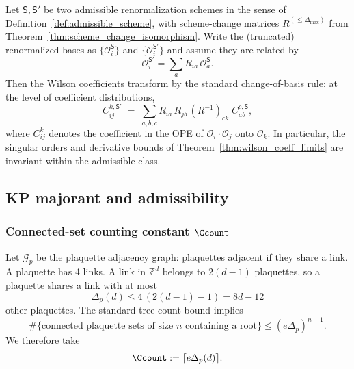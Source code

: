 \begin{corollary}\label{cor:wilson_scheme_covariance}
Let $\mathsf S,\mathsf S'$ be two admissible renormalization schemes in the sense of Definition~\ref{def:admissible_scheme},
with scheme-change matrices $R^{(\le\Delta_{\max})}$ from Theorem~\ref{thm:scheme_change_isomorphism}.
Write the (truncated) renormalized bases as $\{\mathcal O_i^{\mathsf S}\}$ and $\{\mathcal O_i^{\mathsf S'}\}$ and assume they are related by
\[
\mathcal O_i^{\mathsf S'}=\sum_{a} R_{ia}\,\mathcal O_a^{\mathsf S}.
\]
Then the Wilson coefficients transform by the standard change-of-basis rule: at the level of coefficient distributions,
\begin{equation}\label{eq:wilson_covariance_rule}
C^{k,\mathsf S'}_{ij}\;=\;\sum_{a,b,c} R_{ia}\,R_{jb}\,(R^{-1})_{ck}\; C^{c,\mathsf S}_{ab},
\end{equation}
where $C^{k}_{ij}$ denotes the coefficient in the OPE of $\mathcal O_i\cdot \mathcal O_j$ onto $\mathcal O_k$.
In particular, the singular orders and derivative bounds of Theorem~\ref{thm:wilson_coeff_limits} are invariant within the admissible class.
\end{corollary}


\subsection{KP majorant and admissibility}
\label{sec:kp_majorant}

\subsubsection{Connected-set counting constant \texorpdfstring{$\Ccount$}{C\_count}}

Let $\mathcal G_p$ be the plaquette adjacency graph: plaquettes adjacent if they share a link.
A plaquette has 4 links.
A link in $\mathbb Z^d$ belongs to $2(d-1)$ plaquettes, so a plaquette shares a link with at most
\begin{equation}\label{eq:Delta_p}
\Delta_p(d)\le 4\,(2(d-1)-1)=8d-12
\end{equation}
other plaquettes.
The standard tree-count bound implies
\begin{equation}\label{eq:connected_count}
\#\{\text{connected plaquette sets of size $n$ containing a root}\}\le (e\Delta_p)^{n-1}.
\end{equation}
We therefore take
\begin{equation}\label{eq:Ccount_def}
\Ccount:=\lceil e\Delta_p(d)\rceil.
\end{equation}

